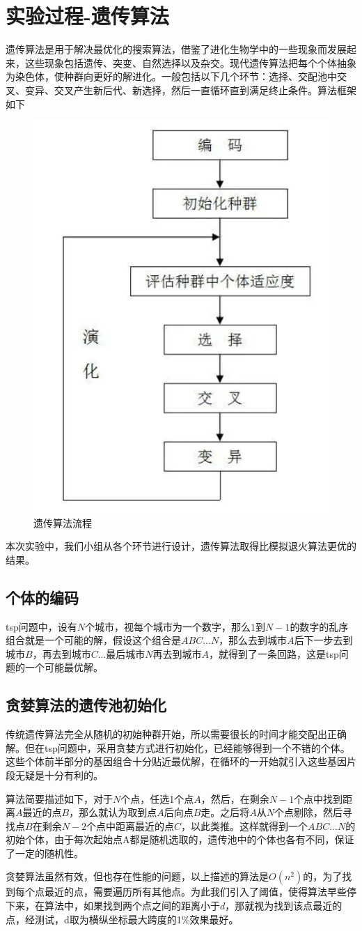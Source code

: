 \documentclass[withoutpreface,bwprint]{cumcmthesis} %
\begin{document}
\section{实验过程-遗传算法}
遗传算法是用于解决最优化的搜索算法，借鉴了进化生物学中的一些现象而发展起来，这些现象包括遗传、突变、自然选择以及杂交。现代遗传算法把每个个体抽象为染色体，使种群向更好的解进化。一般包括以下几个环节：选择、交配池中交叉、变异、交叉产生新后代、新选择，然后一直循环直到满足终止条件。算法框架如下
\begin{figure}[H]
		\centering
		\includegraphics[width=0.5\linewidth]{algo}
		\caption{遗传算法流程}
\end{figure}
本次实验中，我们小组从各个环节进行设计，遗传算法取得比模拟退火算法更优的结果。
\subsection{个体的编码}
tsp问题中，设有$N$个城市，视每个城市为一个数字，那么$1$到$N-1$的数字的乱序组合就是一个可能的解，假设这个组合是$ABC...N$，那么去到城市$A$后下一步去到城市$B$，再去到城市$C$...最后城市$N$再去到城市$A$，就得到了一条回路，这是tsp问题的一个可能最优解。
\subsection{贪婪算法的遗传池初始化}
传统遗传算法完全从随机的初始种群开始，所以需要很长的时间才能交配出正确解。但在tsp问题中，采用贪婪方式进行初始化，已经能够得到一个不错的个体。这些个体前半部分的基因组合十分贴近最优解，在循环的一开始就引入这些基因片段无疑是十分有利的。 \par
算法简要描述如下，对于$N$个点，任选1个点$A$，然后，在剩余$N-1$个点中找到距离$A$最近的点$B$，那么就认为取到点$A$后向点$B$走。之后将$A$从$N$个点剔除，然后寻找点$B$在剩余$N-2$个点中距离最近的点$C$，以此类推。这样就得到一个$ABC...N$的初始个体，由于每次起始点A都是随机选取的，遗传池中的个体也各有不同，保证了一定的随机性。
\par
贪婪算法虽然有效，但也存在性能的问题，以上描述的算法是$O(n^2)$的，为了找到每个点最近的点，需要遍历所有其他点。为此我们引入了阈值，使得算法早些停下来，在算法中，如果找到两个点之间的距离小于$d$，那就视为找到该点最近的点，经测试，d取为横纵坐标最大跨度的1\%效果最好。
\end{document}
